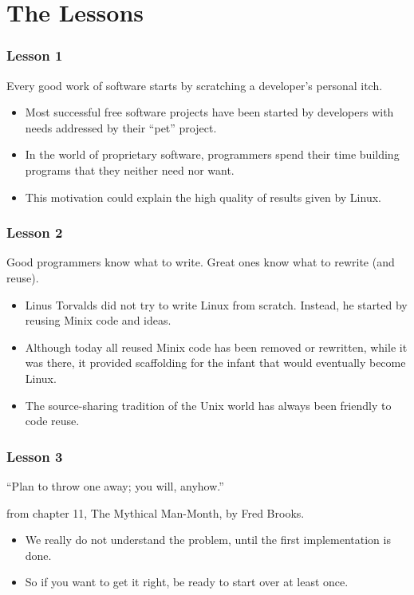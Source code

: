 \documentclass{beamer}
\begin{document}
\section{The Lessons}

\begin{frame}
\frametitle{Lesson 1}

\begin{center}
{\large Every good work of software starts by scratching a developer's
  personal itch.}
\end{center}

\begin{itemize}
\item Most successful free software projects have been started by developers
with needs addressed by their ``pet'' project.
\item In the world of proprietary software, programmers spend their
  time building programs that they neither need nor want.
\item This motivation could explain the high quality of results given
  by Linux.
\end{itemize}

\end{frame}

\begin{frame}
\frametitle{Lesson 2}

\begin{center}
{\large Good programmers know what to write. Great ones know what to
  rewrite (and reuse).}
\end{center}

\begin{itemize}
\item Linus Torvalds did not try to write Linux from scratch. Instead,
  he started by reusing Minix code and ideas.
\item Although today all
  reused Minix code has been removed or rewritten, while it was there,
  it provided scaffolding for the infant that would eventually become
  Linux.
\item The source-sharing tradition of the Unix world has always been
  friendly to code reuse.
\end{itemize}

\end{frame}

\begin{frame}
\frametitle{Lesson 3}

\begin{center}
{\large ``Plan to throw one away; you will, anyhow.''}
\end{center}
from chapter 11, The Mythical Man-Month, by Fred Brooks.

\begin{itemize}
\item We really do not understand the problem, until the first
  implementation is done.
\item So if you want to get it right, be ready to start over at least once.
\end{itemize}

\end{frame}
\end{document}
